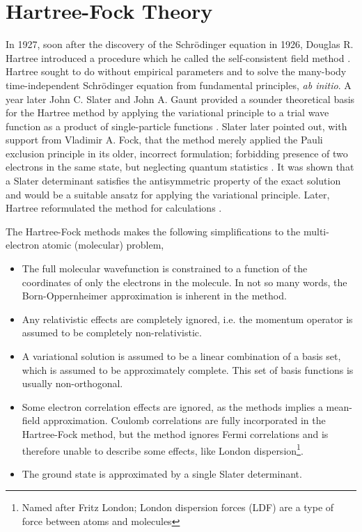 \chapter{Hartree-Fock Theory} 
    \label{ch:hartree_fock}

    In 1927, soon after the discovery of the Schrödinger equation in 1926, Douglas R.
    Hartree introduced a procedure which he called the self-consistent field 
    method \cite{hartree1928wave}. 
    Hartree sought to do without empirical parameters and
    to solve the many-body time-independent Schrödinger equation from fundamental
    principles, \emph{ab initio}. A year later John C. Slater and John A. Gaunt 
    provided a sounder theoretical basis for the Hartree method by applying the 
    variational principle to a trial wave function as a product of single-particle
    functions \cite{slater1928self}\cite{gaunt1928theory}. 
    Slater later pointed out, with support from Vladimir A. Fock, that the method
    merely applied the Pauli exclusion principle in its older, incorrect formulation;
    forbidding presence of two electrons in the same state, but neglecting 
    quantum statistics \cite{slater1930note}\cite{fock1930naherungsmethode}. It was
    shown that a Slater determinant satisfies the antisymmetric property of the
    exact solution and would be a suitable ansatz for applying the variational
    principle. Later, Hartree reformulated the method for 
    calculations \cite{hartree1935self}.

    The Hartree-Fock methods makes the following simplifications to the multi-electron 
    atomic (molecular) problem,
    \begin{itemize}
        \item The full molecular wavefunction is constrained to a function of the
            coordinates of only the electrons in the molecule. In not so many words,
            the Born-Oppernheimer approximation is inherent in the method.
        \item Any relativistic effects are completely ignored, i.e. the momentum
            operator is assumed to be completely non-relativistic.
        \item A variational solution is assumed to be a linear combination of a basis
            set, which is assumed to be approximately complete. This set of basis
            functions is usually non-orthogonal.
        \item Some electron correlation effects are ignored, as the methods implies
            a mean-field approximation. Coulomb correlations are fully incorporated 
            in the Hartree-Fock method, but the method ignores Fermi correlations and is
            therefore unable to describe some effects, like London 
            dispersion\footnote{Named after Fritz London; London dispersion
            forces (LDF) are a type of force between atoms and 
            molecules\cite{heitler1927wechselwirkung}}.
        \item The ground state is approximated by a single 
            Slater determinant. 
    \end{itemize}

